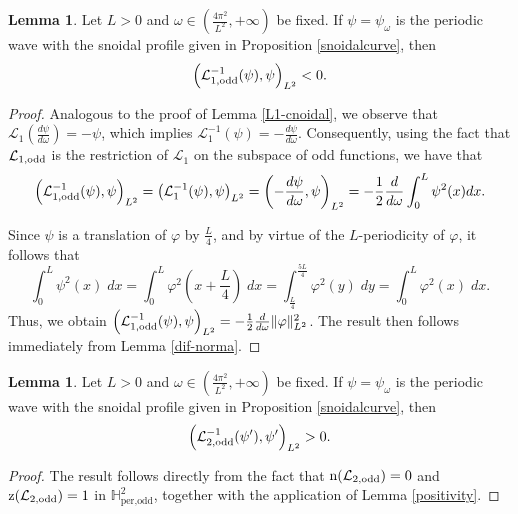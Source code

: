 \documentclass[10pt,reqno,a4paper]{amsart} %
\theoremstyle{definition} %
\numberwithin{equation}{section}
\numberwithin{figure}{section}
\newtheorem{lemma}[theorem]{Lemma}
\begin{document}
\begin{lemma}\label{L1-snoidal}
Let $L>0$ and $\omega \in \left( \frac{4\pi^2}{L^2}, +\infty\right)$ be fixed. If $\psi=\psi_\omega$ is the periodic wave with the snoidal profile given in Proposition \ref{snoidalcurve}, then 
\begin{equation}
    \left( \mathcal{L}_{1,\rm odd}^{-1}(\psi), \psi \right)_{L^2} < 0.
\end{equation}
\end{lemma}
\begin{proof}
    Analogous to the proof of Lemma \ref{L1-cnoidal}, we observe that $\mathcal{L}_1\left( \frac{d \psi}{d \omega} \right) = - \psi$, which implies $\mathcal{L}_1^{-1}(\psi) = - \frac{d\psi}{d\omega}$. Consequently, using the fact that $\mathcal{L}_{1,\rm odd}$ is the restriction of $\mathcal{L}_1$ on the subspace of odd functions, we have that
    \begin{equation*}
        \left( \mathcal{L}_{1,\rm odd}^{-1}(\psi), \psi \right)_{L^2} = \left( \mathcal{L}_1^{-1}(\psi), \psi \right)_{L^2} = \left( -\frac{d\psi}{d\omega}, \psi \right)_{L^2} = - \frac{1}{2} \frac{d}{d\omega} \int_0^L \psi^2(x) dx.
    \end{equation*}

    Since $\psi$ is a translation of $\varphi$ by $\frac{L}{4}$, and by virtue of the $L$-periodicity of $\varphi$, it follows that
    \begin{equation*}
    \int_0^L \psi^2(x)\; dx = \int_0^L \varphi^2\left( x + \frac{L}{4} \right) \; dx = \int_{\frac{L}{4}}^{\frac{5L}{4}} \varphi^2(y)\; dy = \int_{0}^L \varphi^2(x) \; dx.   
    \end{equation*}
    Thus, we obtain $\left( \mathcal{L}_{\rm 1,{\rm odd}}^{-1}(\psi), \psi \right)_{L^2} = -\frac{1}{2} \frac{d}{d\omega} \|\varphi\|_{L^2}^2$. The result then follows immediately from Lemma \ref{dif-norma}.
\end{proof}

\begin{lemma}\label{L2-snoidal}
Let $L>0$ and $\omega \in \left( \frac{4\pi^2}{L^2}, +\infty\right)$ be fixed. If $\psi=\psi_\omega$ is the periodic wave with the snoidal profile given in Proposition \ref{snoidalcurve}, then 
\begin{equation}
    \left( \mathcal{L}_{\rm 2,{\rm odd}}^{-1}(\psi'), \psi' \right)_{L^2} > 0.
\end{equation}
\end{lemma}
\begin{proof}
    The result follows directly from the fact that ${\rm n}(\mathcal{L}_{\rm 2,odd}) = 0$ and ${\rm z}(\mathcal{L}_{\rm 2,odd}) = 1$ in $\mathbb{H}^2_{\text{per,odd}}$, together with the application of Lemma \ref{positivity}.
\end{proof}
\end{document}
